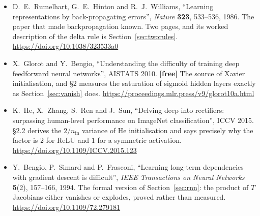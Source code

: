 \documentclass[11pt]{article}
\begin{document}
\begin{itemize}[leftmargin=*]
  \item D.\ E.\ Rumelhart, G.\ E.\ Hinton and R.\ J.\ Williams, ``Learning
    representations by back-propagating errors'', \emph{Nature}
    \textbf{323}, 533--536, 1986. The paper that made backpropagation known.
    Two pages, and its worked description of the delta rule is
    Section~\ref{sec:tworules}. \url{https://doi.org/10.1038/323533a0}
  \item X.\ Glorot and Y.\ Bengio, ``Understanding the difficulty of training
    deep feedforward neural networks'', AISTATS 2010. \textbf{[free]} The
    source of Xavier initialisation, and \S2 measures the saturation of
    sigmoid hidden layers exactly as Section~\ref{sec:vanish} does.
    \url{https://proceedings.mlr.press/v9/glorot10a.html}
  \item K.\ He, X.\ Zhang, S.\ Ren and J.\ Sun, ``Delving deep into
    rectifiers: surpassing human-level performance on ImageNet
    classification'', ICCV 2015. \S2.2 derives the $2/n_{\text{in}}$ variance
    of He initialisation and says precisely why the factor is $2$ for ReLU
    and $1$ for a symmetric activation.
    \url{https://doi.org/10.1109/ICCV.2015.123}
  \item Y.\ Bengio, P.\ Simard and P.\ Frasconi, ``Learning long-term
    dependencies with gradient descent is difficult'', \emph{IEEE Transactions
    on Neural Networks} \textbf{5}(2), 157--166, 1994. The formal version of
    Section~\ref{sec:rnn}: the product of $T$ Jacobians either vanishes or
    explodes, proved rather than measured.
    \url{https://doi.org/10.1109/72.279181}
\end{itemize}

\notesources{\AMLUnitVISources}
\end{document}
